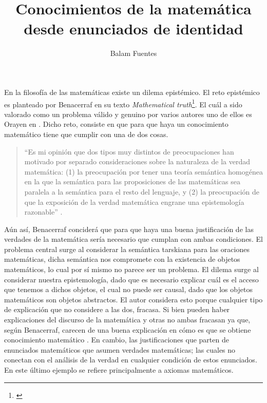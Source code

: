 \documentclass[]{article}
\title{Conocimientos de la matemática 
desde enunciados de identidad}
\author{\large Balam Fuentes}
\begin{document}
\maketitle

\noindent 
En la filosofía de las matemáticas existe un dilema epist\'emico. 
El reto epist\'emico es planteado por Benacerraf en su texto
\textit{Mathematical truth}\footnote{\cite{benacerraf1973mathematical}}.
El cuál a sido valorado como un problema v\'alido y genuino por varios 
autores uno de ellos es Orayen en \cite{orayen1991logica}.
Dicho reto, consiste en que para que haya un conocimiento 
matemático tiene que cumplir con una de dos cosas.
\begin{quotation}
    \noindent \small ``Es mi opinión que dos tipos muy distintos de 
    preocupaciones han motivado por separado consideraciones sobre 
    la naturaleza de la verdad matemática: (1) la preocupación por 
    tener una teoría semántica homogénea en la que la semántica 
    para las proposiciones de las matemáticas sea paralela a 
    la semántica para el resto del lenguaje, y (2) la preocupación 
    de que la exposición de la verdad matemática engrane una 
    epistemología razonable'' \cite{benacerraf2004verdad}.
\end{quotation}  

Aún así, Benacerraf conciderá que para que haya una 
buena justificación de las verdades de la matemática 
sería necesario que cumplan con ambas condiciones. El problema 
central surge al considerar la semántica tarskiana para las 
oraciones matemáticas, dicha semántica nos compromete con la 
existencia de objetos matemáticos, lo cual por sí mismo no 
parece ser un problema. El dilema surge al considerar nuestra 
epistemología, dado que es necesario explicar cuál es el acceso 
que tenemos a dichos objetos, el cual no puede ser causal, dado 
que los objetos matemáticos son objetos abstractos.
El autor considera esto porque cualquier tipo de 
explicación que no considere a las dos, fracasa. Si  
bien pueden haber explicaciones del discurso de la 
matemática y otras no 
ambas fracasan ya que, según Benacerraf, carecen de 
una buena explicación en c\'omo es que se obtiene 
conocimiento matemático \cite{benacerraf2004verdad}. 
En cambio, las justificaciones que parten de enunciados matemáticos
que asumen verdades matemáticas; las cuales no conectan 
con el análisis de la verdad en cualquier condición de estos 
enunciados. En este último ejemplo se refiere 
principalmente a axiomas matemáticos. 
\end{document}
